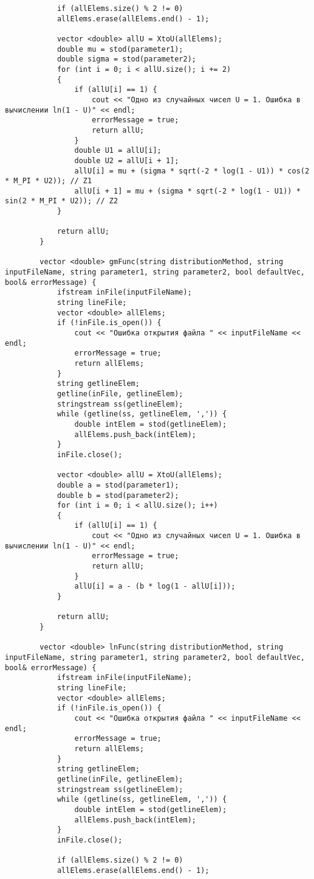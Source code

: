 \documentclass[bachelor, och, coursework]{shiza}
\begin{document}
\begin{verbatim}
			if (allElems.size() % 2 != 0)
			allElems.erase(allElems.end() - 1);
			
			vector <double> allU = XtoU(allElems);
			double mu = stod(parameter1);
			double sigma = stod(parameter2);
			for (int i = 0; i < allU.size(); i += 2)
			{
				if (allU[i] == 1) {
					cout << "Одно из случайных чисел U = 1. Ошибка в вычислении ln(1 - U)" << endl;
					errorMessage = true;
					return allU;
				}
				double U1 = allU[i];
				double U2 = allU[i + 1];
				allU[i] = mu + (sigma * sqrt(-2 * log(1 - U1)) * cos(2 * M_PI * U2)); // Z1
				allU[i + 1] = mu + (sigma * sqrt(-2 * log(1 - U1)) * sin(2 * M_PI * U2)); // Z2
			}
			
			return allU;
		}
		
		vector <double> gmFunc(string distributionMethod, string inputFileName, string parameter1, string parameter2, bool defaultVec, bool& errorMessage) {
			ifstream inFile(inputFileName);
			string lineFile;
			vector <double> allElems;
			if (!inFile.is_open()) {
				cout << "Ошибка открытия файла " << inputFileName << endl;
				errorMessage = true;
				return allElems;
			}
			string getlineElem;
			getline(inFile, getlineElem);
			stringstream ss(getlineElem);
			while (getline(ss, getlineElem, ',')) {
				double intElem = stod(getlineElem);
				allElems.push_back(intElem);
			}
			inFile.close();
			
			vector <double> allU = XtoU(allElems);
			double a = stod(parameter1);
			double b = stod(parameter2);
			for (int i = 0; i < allU.size(); i++)
			{
				if (allU[i] == 1) {
					cout << "Одно из случайных чисел U = 1. Ошибка в вычислении ln(1 - U)" << endl;
					errorMessage = true;
					return allU;
				}
				allU[i] = a - (b * log(1 - allU[i]));
			}
			
			return allU;
		}
		
		vector <double> lnFunc(string distributionMethod, string inputFileName, string parameter1, string parameter2, bool defaultVec, bool& errorMessage) {
			ifstream inFile(inputFileName);
			string lineFile;
			vector <double> allElems;
			if (!inFile.is_open()) {
				cout << "Ошибка открытия файла " << inputFileName << endl;
				errorMessage = true;
				return allElems;
			}
			string getlineElem;
			getline(inFile, getlineElem);
			stringstream ss(getlineElem);
			while (getline(ss, getlineElem, ',')) {
				double intElem = stod(getlineElem);
				allElems.push_back(intElem);
			}
			inFile.close();
			
			if (allElems.size() % 2 != 0)
			allElems.erase(allElems.end() - 1);
			

\end{verbatim}
\end{document}

